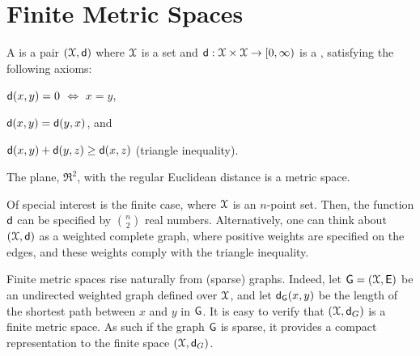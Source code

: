 %

%


% 

\ChapterPrefix{}
\ChapterGen{}



\section{Finite Metric Spaces}



\begin{defn}
    A   is a pair
    $(\FMS, \DistChar)$ where $\FMS$ is a set and
    $\DistChar: \FMS \times \FMS \rightarrow [0, \infty)$ is a
    , satisfying the following axioms:
    \begin{compactenumi}
        \item $\mathsf{d}(x,y) = 0$ $\iff$ $x =y$,
        \item $\DistMtr{x}{y}= \DistMtr{y}{x}$, and
        \item $\DistMtr{x}{y} + \DistMtr{y}{z} \geq \DistMtr{x}{z}$
        (triangle inequality).
    \end{compactenumi}
\end{defn}

The plane, $\Re^2$, with the regular Euclidean distance is a metric
space.

Of special interest is the finite case, where $\FMS$ is an $n$-point
set. Then, the function $\mathsf{d}$ can be specified by $\binom{n}{2}$
real numbers. Alternatively, one can think about $(\FMS,\DistChar)$ as
a weighted complete graph, where positive weights are specified on the
edges, and these weights comply with the triangle inequality.

Finite metric spaces rise naturally from (sparse) graphs.  Indeed, let
$\Graph=(\FMS,\Edges)$ be an undirected weighted graph defined over
$\FMS$, and let $\dGY{x}{y}$ be the length of the shortest path
between $x$ and $y$ in $\mathsf{G}$. It is easy to verify that
$(\FMS, \DistChar_G)$ is a finite metric space. As such if the graph
$\mathsf{G}$ is sparse, it provides a compact representation to the finite
space $(\FMS, \DistChar_G)$.

